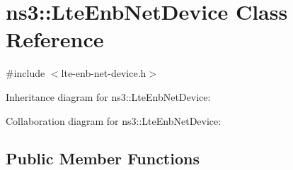 \hypertarget{classns3_1_1LteEnbNetDevice}{}\section{ns3\+:\+:Lte\+Enb\+Net\+Device Class Reference}
\label{classns3_1_1LteEnbNetDevice}


{\ttfamily \#include $<$lte-\/enb-\/net-\/device.\+h$>$}



Inheritance diagram for ns3\+:\+:Lte\+Enb\+Net\+Device\+:


Collaboration diagram for ns3\+:\+:Lte\+Enb\+Net\+Device\+:
\subsection*{Public Member Functions}
